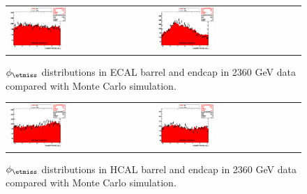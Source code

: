 \begin{figure}[h!]
 \centering
 \begin{tabular}{ll}
  \includegraphics[width=0.40\textwidth]{plots_DataVsMC_MB_2360GeV/my_calometEBPhi_lin.eps} &
  \includegraphics[width=0.40\textwidth]{plots_DataVsMC_MB_2360GeV/my_calometEEPhi_lin.eps} \\
 \end{tabular}
 \caption{$\phi_{\etmiss}$ distributions in ECAL barrel and endcap in 2360 GeV data compared
   with Monte Carlo simulation.
          \label{fig:DataVsMC_MB_2360_12}}
\end{figure}

\begin{figure}[h!]
 \centering
 \begin{tabular}{ll}
  \includegraphics[width=0.40\textwidth]{plots_DataVsMC_MB_2360GeV/my_calometHBPhi_lin.eps} &
  \includegraphics[width=0.40\textwidth]{plots_DataVsMC_MB_2360GeV/my_calometHEPhi_lin.eps} \\
 \end{tabular}
 \caption{$\phi_{\etmiss}$ distributions in HCAL barrel and endcap in 2360 GeV data compared
   with Monte Carlo simulation.
          \label{fig:DataVsMC_MB_2360_13}}
\end{figure}

